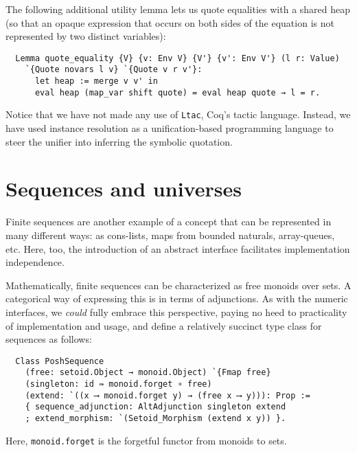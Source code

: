 \documentclass[a4paper,10pt,runningheads]{llncs}
\begin{document}
The following additional utility lemma lets us quote equalities with a shared heap (so that an opaque expression that occurs on both sides of the equation is not represented by two distinct variables):
\begin{lstlisting}
  Lemma quote_equality {V} {v: Env V} {V'} {v': Env V'} (l r: Value)
    `{Quote novars l v} `{Quote v r v'}:
      let heap := merge v v' in
      eval heap (map_var shift quote) = eval heap quote → l = r.
\end{lstlisting}

Notice that we have not made any use of \lstinline|Ltac|, Coq's tactic language. Instead, we have used instance resolution as a unification-based programming language to steer the unifier into inferring the symbolic quotation.

\section{Sequences and universes}\label{sequences}

Finite sequences are another example of a concept that can be represented in many different ways: as cons-lists, maps from bounded naturals, array-queues, etc. Here, too, the introduction of an abstract interface facilitates implementation independence.

Mathematically, finite sequences can be characterized as free monoids over sets. A categorical way of expressing this is in terms of adjunctions. As with the numeric interfaces, we \emph{could} fully embrace this perspective, paying no heed to practicality of implementation and usage, and define a relatively succinct type class for sequences as follows:
\begin{lstlisting}
  Class PoshSequence
    (free: setoid.Object → monoid.Object) `{Fmap free}
    (singleton: id ⇛ monoid.forget ∘ free)
    (extend: `((x ⟶ monoid.forget y) → (free x ⟶ y))): Prop :=
    { sequence_adjunction: AltAdjunction singleton extend
    ; extend_morphism: `(Setoid_Morphism (extend x y)) }.
\end{lstlisting}
Here, \lstinline|monoid.forget| is the forgetful functor from monoids to sets.
\end{document}
